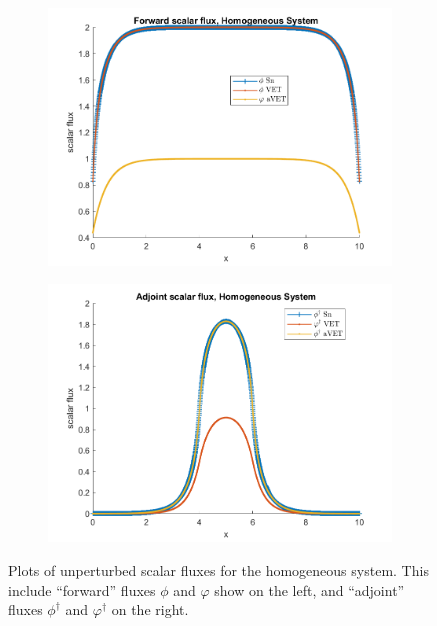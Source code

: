 \documentclass[12pt]{report}
\begin{document}
\begin{figure}[H]
\centering
\begin{subfigure}{.5\textwidth}
  \centering
  \includegraphics[width=.98\linewidth]{figures2/22phi.png}
\end{subfigure}%
\begin{subfigure}{.5\textwidth}
  \centering
  \includegraphics[width=.98\linewidth]{figures2/22phia.png}
\end{subfigure}
\caption{Plots of unperturbed scalar fluxes for the homogeneous system. This include ``forward'' fluxes $\phi$ and $\varphi$ show on the left, and ``adjoint'' fluxes $\phi^\dag$ and $\varphi^\dag$ on the right.}
\label{fig:Flux1}
\end{figure}
\end{document}
